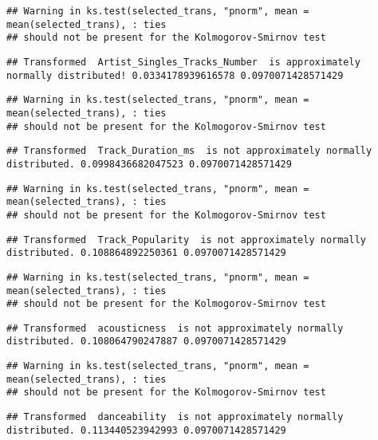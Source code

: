 \documentclass[
]{article}
\begin{document}
\begin{verbatim}
## Warning in ks.test(selected_trans, "pnorm", mean = mean(selected_trans), : ties
## should not be present for the Kolmogorov-Smirnov test
\end{verbatim}

\begin{verbatim}
## Transformed  Artist_Singles_Tracks_Number  is approximately normally distributed! 0.0334178939616578 0.0970071428571429
\end{verbatim}

\begin{verbatim}
## Warning in ks.test(selected_trans, "pnorm", mean = mean(selected_trans), : ties
## should not be present for the Kolmogorov-Smirnov test
\end{verbatim}

\begin{verbatim}
## Transformed  Track_Duration_ms  is not approximately normally distributed. 0.0998436682047523 0.0970071428571429
\end{verbatim}

\begin{verbatim}
## Warning in ks.test(selected_trans, "pnorm", mean = mean(selected_trans), : ties
## should not be present for the Kolmogorov-Smirnov test
\end{verbatim}

\begin{verbatim}
## Transformed  Track_Popularity  is not approximately normally distributed. 0.108864892250361 0.0970071428571429
\end{verbatim}

\begin{verbatim}
## Warning in ks.test(selected_trans, "pnorm", mean = mean(selected_trans), : ties
## should not be present for the Kolmogorov-Smirnov test
\end{verbatim}

\begin{verbatim}
## Transformed  acousticness  is not approximately normally distributed. 0.108064790247887 0.0970071428571429
\end{verbatim}

\begin{verbatim}
## Warning in ks.test(selected_trans, "pnorm", mean = mean(selected_trans), : ties
## should not be present for the Kolmogorov-Smirnov test
\end{verbatim}

\begin{verbatim}
## Transformed  danceability  is not approximately normally distributed. 0.113440523942993 0.0970071428571429
\end{verbatim}
\end{document}
